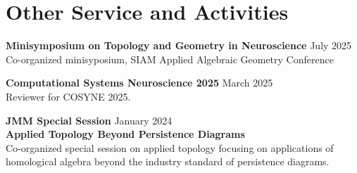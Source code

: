 \documentclass[10pt,letterpaper]{article}
\renewenvironment{itemize}{
  \begin{list}{}{
    \setlength{\leftmargin}{1.5em}
    \setlength{\itemsep}{0.25em}
    \setlength{\parskip}{0pt}
    \setlength{\parsep}{0.25em}
  }
}{
  \end{list}
}
\begin{document}
\section*{Other Service and Activities}

\begin{itemize}

\item{\bf Minisymposium on Topology and Geometry in Neuroscience} \hfill July 2025\\
Co-organized minisyposium, SIAM Applied Algebraic Geometry Conference


\item{\bf Computational Systems Neuroscience 2025} \hfill March 2025\\
Reviewer for COSYNE 2025.

\item{\bf JMM Special Session} \hfill January 2024\\{\bf Applied Topology Beyond Persistence Diagrams}\\
{Co-organized special session on applied topology focusing on applications of homological algebra beyond the industry standard of persistence diagrams.}





\end{itemize}
\end{document}
